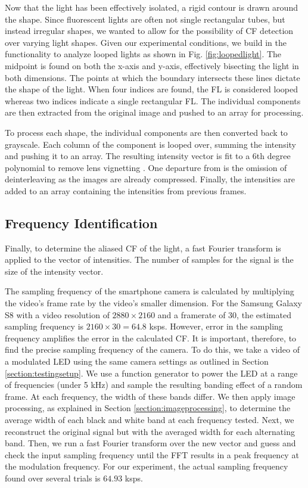 \documentclass[conference]{IEEEtran}
\begin{document}
Now that the light has been effectively isolated, a rigid contour is drawn around the shape. Since fluorescent lights are often not single rectangular tubes, but instead irregular shapes, we wanted to allow for the possibility of CF detection over varying light shapes. Given our experimental conditions, we build in the functionality to analyze looped lights as shown in Fig. \ref{fig:loopedlight}. The midpoint is found on both the x-axis and y-axis, effectively bisecting the light in both dimensions. The points at which the boundary intersects these lines dictate the shape of the light. When four indices are found, the FL is considered looped whereas two indices indicate a single rectangular FL. The individual components are then extracted from the original image and pushed to an array for processing.

To process each shape, the individual components are then converted back to grayscale. Each column of the component is looped over, summing the intensity and pushing it to an array. The resulting intensity vector is fit to a 6th degree polynomial to remove lens vignetting \cite{zhang2016litell}. One departure from \cite{zhang2016litell} is the omission of deinterleaving as the images are already compressed. Finally, the intensities are added to an array containing the intensities from previous frames.

\subsection{Frequency Identification}\label{section:frequencyidentification}

Finally, to determine the aliased CF of the light, a fast Fourier transform is applied to the vector of intensities. The number of samples for the signal is the size of the intensity vector.

The sampling frequency of the smartphone camera is calculated by multiplying the video's frame rate by the video's smaller dimension. For the Samsung Galaxy S8 with a video resolution of $2880 \times 2160$ and a framerate of $30$, the estimated sampling frequency is $2160 \times 30 = 64.8$ ksps. However, error in the sampling frequency amplifies the error in the calculated CF. It is important, therefore, to find the precise sampling frequency of the camera. To do this, we take a video of a modulated LED using the same camera settings as outlined in Section \ref{section:testingsetup}. We use a function generator to power the LED at a range of frequencies (under 5 kHz) and sample the resulting banding effect of a random frame. At each frequency, the width of these bands differ. We then apply image processing, as explained in Section \ref{section:imageprocessing}, to determine the average width of each black and white band at each frequency tested. Next, we reconstruct the original signal but with the averaged width for each alternating band. Then, we run a fast Fourier transform over the new vector and guess and check the input sampling frequency until the FFT results in a peak frequency at the modulation frequency. For our experiment, the actual sampling frequency found over several trials is $64.93$ ksps.
\end{document}
